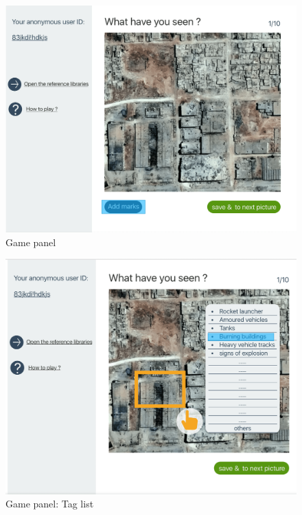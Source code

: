 \noindent\begin{minipage}{.45\textwidth}
\begin{figure}[H]
\centering
\includegraphics[width=\textwidth]{figures/function-player-0}
\caption{Game panel \cite{satellite-photo-1}}
\label{fig:player0}
\end{figure}
\end{minipage}\hfill
\noindent\begin{minipage}{.45\textwidth}
\begin{figure}[H]
\centering
\includegraphics[width=\textwidth]{figures/function-player-1}
\caption{Game panel: Tag list \cite{satellite-photo-1}}
\label{fig:player1}
\end{figure}
\end{minipage}\hfill

